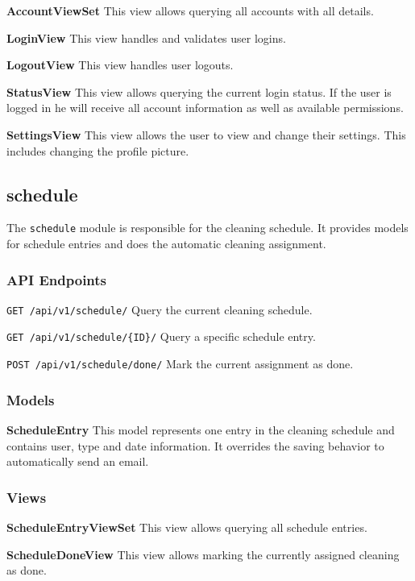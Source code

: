 \textbf{AccountViewSet} This view allows querying all accounts with all
details.

\textbf{LoginView} This view handles and validates user logins.

\textbf{LogoutView} This view handles user logouts.

\textbf{StatusView} This view allows querying the current login status.
If the user is logged in he will receive all account information as well
as available permissions.

\textbf{SettingsView} This view allows the user to view and change their
settings. This includes changing the profile picture.

\subsection{schedule}\label{schedule}

The \texttt{schedule} module is responsible for the cleaning schedule.
It provides models for schedule entries and does the automatic cleaning
assignment.

\subsubsection{API Endpoints}\label{api-endpoints-1}

\texttt{GET\ /api/v1/schedule/} Query the current cleaning schedule.

\texttt{GET\ /api/v1/schedule/\{ID\}/} Query a specific schedule entry.

\texttt{POST\ /api/v1/schedule/done/} Mark the current assignment as
done.

\subsubsection{Models}\label{models-3}

\textbf{ScheduleEntry} This model represents one entry in the cleaning
schedule and contains user, type and date information. It overrides the
saving behavior to automatically send an email.

\subsubsection{Views}\label{views-3}

\textbf{ScheduleEntryViewSet} This view allows querying all schedule
entries.

\textbf{ScheduleDoneView} This view allows marking the currently
assigned cleaning as done.

